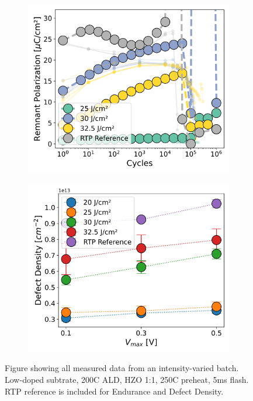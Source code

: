 \documentclass[11pt,twoside]{eitExjobb}
\begin{document}
\begin{figure}[htbp]
    \begin{subfigure}{.4\linewidth}
        \includegraphics[width=\linewidth]{fig/FlashIntC_EnduTrends.png}
        \caption{}\label{fig:res_IntCEndu}
    \end{subfigure}
    \begin{subfigure}{.4\linewidth}
        \includegraphics[width=\linewidth]{fig/FlashIntC_DDTrends.png}
        \caption{}\label{fig:res_IntCDD}
    \end{subfigure}
    \caption{Figure showing all measured data from an intensity-varied batch.
    Low-doped subtrate, 200C ALD, HZO 1:1, 250C preheat, 5ms flash. RTP
    reference is included for Endurance and Defect Density.}\label{fig:res_IntC}
\end{figure}
\end{document}
